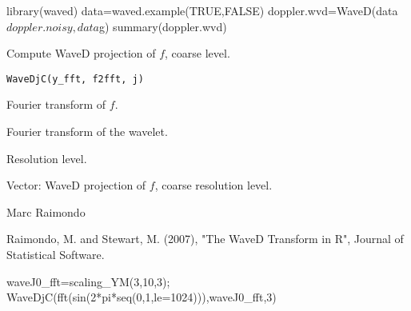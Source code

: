 \documentclass{article}
\begin{document}
\begin{SeeAlso}\relax
{}
\end{SeeAlso}
\begin{Examples}
\begin{ExampleCode}
library(waved)
data=waved.example(TRUE,FALSE)
doppler.wvd=WaveD(data$doppler.noisy,data$g)
summary(doppler.wvd)
\end{ExampleCode}
\end{Examples}

\begin{Description}\relax
Compute WaveD projection of $f$, coarse level.
\end{Description}
\begin{Usage}
\begin{verbatim}
WaveDjC(y_fft, f2fft, j)
\end{verbatim}
\end{Usage}
\begin{Arguments}
\begin{ldescription}
\item[\code{y\_fft}] Fourier transform of $f$. 
\item[\code{f2fft}] Fourier transform of the wavelet.
\item[\code{j}] Resolution level. 
\end{ldescription}
\end{Arguments}
\begin{Value}
Vector:  WaveD projection of $f$, coarse resolution level.
\end{Value}
\begin{Author}\relax
Marc Raimondo
\end{Author}
\begin{References}\relax
Raimondo, M. and Stewart, M. (2007),
"The WaveD Transform in R", Journal of Statistical Software.
\end{References}
\begin{SeeAlso}\relax
{}
\end{SeeAlso}
\begin{Examples}
\begin{ExampleCode}

waveJ0_fft=scaling_YM(3,10,3);
WaveDjC(fft(sin(2*pi*seq(0,1,le=1024))),waveJ0_fft,3)
\end{ExampleCode}
\end{Examples}
\end{document}

